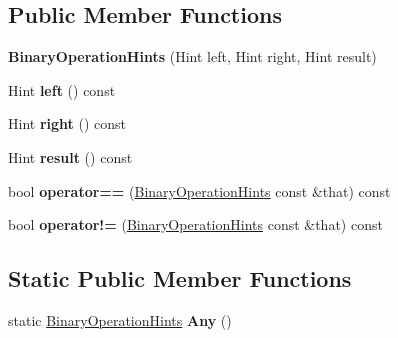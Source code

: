 \subsection*{Public Member Functions}
\begin{DoxyCompactItemize}
\item 
{\bfseries Binary\+Operation\+Hints} (Hint left, Hint right, Hint result)\hypertarget{classv8_1_1internal_1_1compiler_1_1_binary_operation_hints_a3fb2cb5b96e71d853430be120d929e97}{}\label{classv8_1_1internal_1_1compiler_1_1_binary_operation_hints_a3fb2cb5b96e71d853430be120d929e97}

\item 
Hint {\bfseries left} () const \hypertarget{classv8_1_1internal_1_1compiler_1_1_binary_operation_hints_a66d838f8e37b77e38a97b94efdfb5495}{}\label{classv8_1_1internal_1_1compiler_1_1_binary_operation_hints_a66d838f8e37b77e38a97b94efdfb5495}

\item 
Hint {\bfseries right} () const \hypertarget{classv8_1_1internal_1_1compiler_1_1_binary_operation_hints_af3e964fcfe77b19868a122bf20d7cf43}{}\label{classv8_1_1internal_1_1compiler_1_1_binary_operation_hints_af3e964fcfe77b19868a122bf20d7cf43}

\item 
Hint {\bfseries result} () const \hypertarget{classv8_1_1internal_1_1compiler_1_1_binary_operation_hints_afe96b7bef09cff265df87be4af1cd73d}{}\label{classv8_1_1internal_1_1compiler_1_1_binary_operation_hints_afe96b7bef09cff265df87be4af1cd73d}

\item 
bool {\bfseries operator==} (\hyperlink{classv8_1_1internal_1_1compiler_1_1_binary_operation_hints}{Binary\+Operation\+Hints} const \&that) const \hypertarget{classv8_1_1internal_1_1compiler_1_1_binary_operation_hints_ad0be90ed5eb0bc4326cd9264226917dd}{}\label{classv8_1_1internal_1_1compiler_1_1_binary_operation_hints_ad0be90ed5eb0bc4326cd9264226917dd}

\item 
bool {\bfseries operator!=} (\hyperlink{classv8_1_1internal_1_1compiler_1_1_binary_operation_hints}{Binary\+Operation\+Hints} const \&that) const \hypertarget{classv8_1_1internal_1_1compiler_1_1_binary_operation_hints_a98c926dc1b7310dfe15abf8c9dd6474a}{}\label{classv8_1_1internal_1_1compiler_1_1_binary_operation_hints_a98c926dc1b7310dfe15abf8c9dd6474a}

\end{DoxyCompactItemize}
\subsection*{Static Public Member Functions}
\begin{DoxyCompactItemize}
\item 
static \hyperlink{classv8_1_1internal_1_1compiler_1_1_binary_operation_hints}{Binary\+Operation\+Hints} {\bfseries Any} ()\hypertarget{classv8_1_1internal_1_1compiler_1_1_binary_operation_hints_a1d266d2aff2a93edf7967b1626891f7d}{}\label{classv8_1_1internal_1_1compiler_1_1_binary_operation_hints_a1d266d2aff2a93edf7967b1626891f7d}

\end{DoxyCompactItemize}
